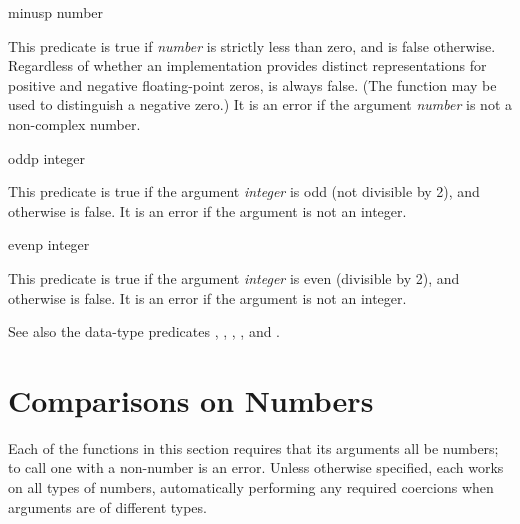 \begin{defun}[Function]
minusp number

This predicate is true if \emph{number} is strictly less than zero,
and is false otherwise.
Regardless of whether an implementation provides distinct representations
for positive and negative floating-point zeros,
 is always false.
(The function  may be used to distinguish a negative zero.)
It is an error if the argument \emph{number} is not a non-complex number.
\end{defun}

\begin{defun}[Function]
oddp integer

This predicate is true if the argument \emph{integer} is odd (not divisible
by 2), and otherwise is false.  It is an error if the argument is not
an integer.
\end{defun}

\begin{defun}[Function]
evenp integer

This predicate is true if the argument \emph{integer} is even (divisible
by 2), and otherwise is false.  It is an error if the argument is not
an integer.
\end{defun}

See also the data-type predicates ,
, , , and .

\section{Comparisons on Numbers}

Each of the functions in this section requires that its arguments all be
numbers; to call one with a non-number is an error.  Unless otherwise
specified, each works on all types of numbers, automatically performing
any required coercions when arguments are of different types.

